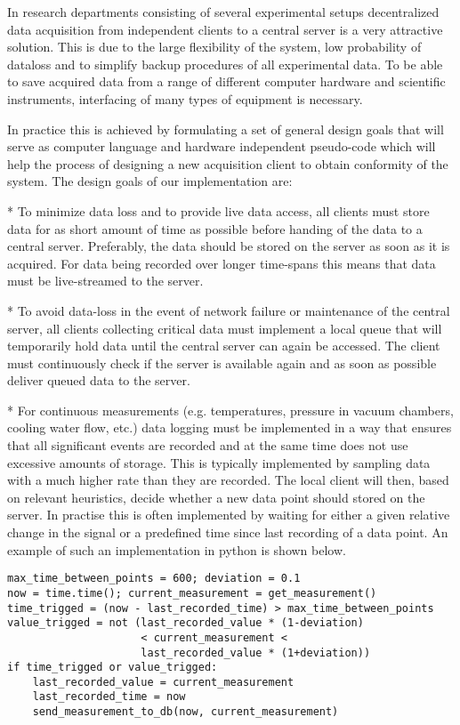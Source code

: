 In research departments consisting of several experimental setups decentralized
data acquisition from independent clients to a central server is a very
attractive solution. This is due to the large flexibility of the system, low
probability of dataloss and to simplify backup procedures of all experimental
data. To be able to save acquired data from a range of different computer
hardware and scientific instruments, interfacing of many types of equipment is
necessary.

In practice this is achieved by formulating a set of general design goals that
will serve as computer language and hardware independent pseudo-code which will
help the process of designing a new acquisition client to obtain conformity of
the system. The design goals of our implementation are:

* To minimize data loss and to provide live data access, 
  all clients must store data for as short amount of time as
  possible before handing of the data to a central server. Preferably, the data
  should be stored on the server as soon as it is acquired. For data being
  recorded over longer time-spans this means that data must be live-streamed to
  the server.

* To avoid data-loss in the event of network failure or maintenance
  of the central server, all clients collecting critical data must implement a
  local queue that will temporarily hold data until the central server can
  again be accessed. The client must continuously check if the server is
  available again and as soon as possible deliver queued data to the server.

* For continuous measurements (e.g. temperatures, pressure in vacuum chambers,
  cooling water flow, etc.) data logging must be implemented in a way that
  ensures that all significant events are recorded and at the same time does
  not use excessive amounts of storage. This is typically implemented by
  sampling data with a much higher rate than they are recorded. The local
  client will then, based on relevant heuristics, decide whether a new data
  point should stored on the server. In practise this is often implemented by
  waiting for either a given relative change in the signal or a predefined time
  since last recording of a data point. An example of such an implementation
  in python is shown below.

\begin{verbatim}
max_time_between_points = 600; deviation = 0.1
now = time.time(); current_measurement = get_measurement()
time_trigged = (now - last_recorded_time) > max_time_between_points
value_trigged = not (last_recorded_value * (1-deviation)
                     < current_measurement <
                     last_recorded_value * (1+deviation))
if time_trigged or value_trigged:
    last_recorded_value = current_measurement
    last_recorded_time = now
    send_measurement_to_db(now, current_measurement)
\end{verbatim}
  
